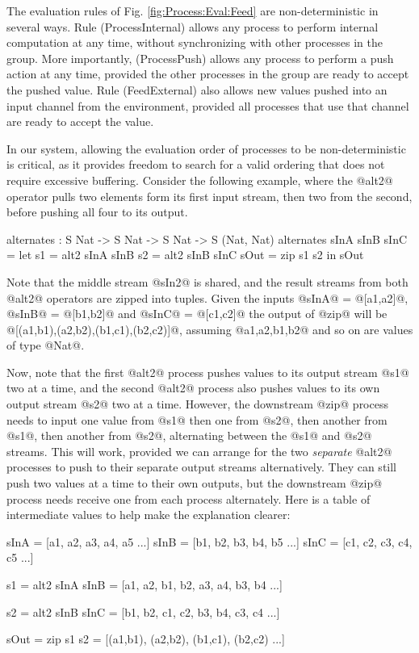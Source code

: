 The evaluation rules of Fig. \ref{fig:Process:Eval:Feed} are non-deterministic in several ways. Rule (ProcessInternal) allows any process to perform internal computation at any time, without synchronizing with other processes in the group. More importantly, (ProcessPush) allows any process to perform a push action at any time, provided the other processes in the group are ready to accept the pushed value. Rule (FeedExternal) also allows new values pushed into an input channel from the environment, provided all processes that use that channel are ready to accept the value.

In our system, allowing the evaluation order of processes to be non-deterministic is critical, as it provides freedom to search for a valid ordering that does not require excessive buffering. Consider the following example, where the @alt2@ operator pulls two elements form its first input stream, then two from the second, before pushing all four to its output.
\begin{code}
  alternates : S Nat -> S Nat -> S Nat -> S (Nat, Nat)
  alternates sInA sInB sInC
   = let  s1   = alt2 sInA sInB
          s2   = alt2 sInB sInC
          sOut = zip s1 s2
     in   sOut
\end{code}

Note that the middle stream @sIn2@ is shared, and the result streams from both @alt2@ operators are zipped into tuples. Given the inputs @sInA@ = @[a1,a2]@, @sInB@ = @[b1,b2]@ and @sInC@ = @[c1,c2]@ the output of @zip@ will be @[(a1,b1),(a2,b2),(b1,c1),(b2,c2)]@, assuming @a1,a2,b1,b2@ and so on are values of type @Nat@.

Now, note that the first @alt2@ process pushes values to its output stream @s1@ two at a time, and the second @alt2@ process also pushes values to its own output stream @s2@ two at a time. However, the downstream @zip@ process needs to input one value from @s1@ then one from @s2@, then another from @s1@, then another from @s2@, alternating between the @s1@ and @s2@ streams. This will work, provided we can arrange for the two \emph{separate} @alt2@ processes to push to their separate output streams alternatively. They can still push two values at a time to their own outputs, but the downstream @zip@ process needs receive one from each process alternately. Here is a table of intermediate values to help make the explanation clearer:

\begin{code}
    sInA = [a1, a2, a3, a4, a5 ...]
    sInB = [b1, b2, b3, b4, b5 ...]
    sInC = [c1, c2, c3, c4, c5 ...]

    s1   = alt2 sInA sInB 
         = [a1, a2, b1, b2, a3, a4, b3, b4 ...]

    s2   = alt2 sInB sInC
         = [b1, b2, c1, c2, b3, b4, c3, c4 ...]

    sOut = zip s1 s2
         = [(a1,b1), (a2,b2), (b1,c1), (b2,c2) ...]
\end{code}


